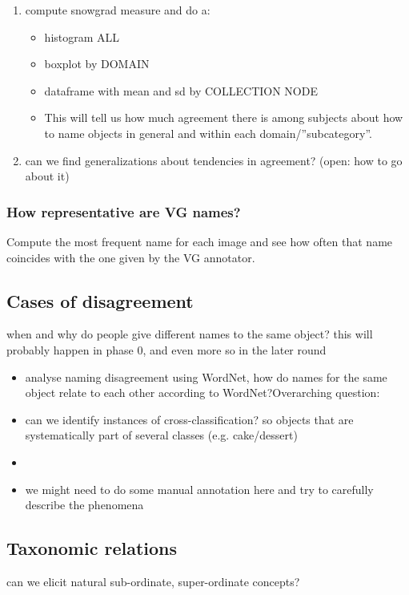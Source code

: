 \begin{enumerate}
\item compute snowgrad measure and do a:
  \begin{itemize}
  \item histogram ALL
  \item boxplot by DOMAIN
  \item dataframe with mean and sd by COLLECTION NODE 
  \item[\ra] This will tell us how much agreement there is among subjects about how to name objects in general and within each domain/''subcategory''.
  \end{itemize}
\item can we find generalizations about tendencies in agreement? (open: how to go about it)
\end{enumerate}

\subsubsection{How representative are VG names?}
\label{sec:vg}

Compute the most frequent name for each image and see how often that name coincides with the one given by the VG annotator.

\subsection{Cases of disagreement}

when and why do people give different names to the same object? this will probably happen in phase 0, and even more so in the later round 


\begin{itemize}
\item analyse naming disagreement using WordNet, how do names for the same object relate to each other according to WordNet?Overarching question: 
\item can we identify instances of cross-classification? so objects that are systematically part of several classes (e.g. cake/dessert)
\item {}
\item we might need to do some manual annotation here and try to carefully describe the phenomena
\end{itemize}

\subsection{Taxonomic relations}

can we elicit natural sub-ordinate, super-ordinate concepts?

